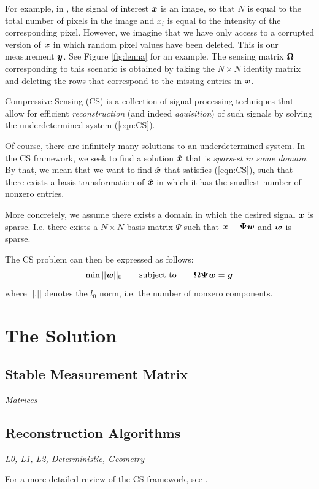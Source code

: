 For example, in \cite{pilikos2014}, the signal of interest $\boldsymbol x$ is an image, so that $N$ is equal to the total number of pixels in the image and $x_i$ is equal to the intensity of the corresponding pixel.
However, we imagine that we have only access to a corrupted version of $\boldsymbol x$ in which random pixel values have been deleted.
This is our measurement $\boldsymbol y$. See Figure \ref{fig:lenna} for an example.
The sensing matrix $\boldsymbol\Omega$ corresponding to this scenario is obtained by taking the $N\times N$ identity matrix and deleting the rows that correspond to the missing entries in $\boldsymbol x$.

Compressive Sensing (CS) is a collection of signal processing techniques that allow for efficient \emph{reconstruction} (and indeed \emph{aquisition}) of such signals by solving the underdetermined system (\ref{eqn:CS}).

Of course, there are infinitely many solutions to an underdetermined system.
In the CS framework, we seek to find a solution $\hat{\boldsymbol x}$ that is \emph{sparsest in some domain}.
By that, we mean that we want to find $\hat{\boldsymbol x}$ that satisfies (\ref{eqn:CS}), such that there exists a basis transformation of $\hat{\boldsymbol x}$ in which it has the smallest number of nonzero entries.

More concretely, we assume there exists a domain in which the desired signal $\boldsymbol x$ is sparse. 
I.e. there exists a $N\times N$ basis matrix $\Psi$ such that $\boldsymbol x = \boldsymbol\Psi \boldsymbol w$ and $\boldsymbol w$ is sparse.

The CS problem can then be expressed as follows:
\begin{equation}
\label{eqn:CSproblem}
\min||\boldsymbol w||_0 \qquad\mbox{subject to}\qquad \boldsymbol\Omega\boldsymbol\Psi\boldsymbol w = \boldsymbol y
\end{equation}
where $||.||$ denotes the $l_0$ norm, i.e. the number of nonzero components.


\section{The Solution}
\subsection{Stable Measurement Matrix}
\emph{Matrices}
\subsection{Reconstruction Algorithms}
\emph{L0, L1, L2, Deterministic, Geometry}

For a more detailed review of the CS framework, see \cite{candes2008}.


